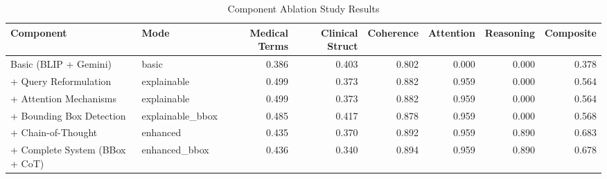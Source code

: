 \begin{table}
\caption{Component Ablation Study Results}
\label{tab:ablation}
\begin{tabular}{llrrrrrr}
\toprule
Component & Mode & Medical Terms & Clinical Struct & Coherence & Attention & Reasoning & Composite \\
\midrule
Basic (BLIP + Gemini) & basic & 0.386 & 0.403 & 0.802 & 0.000 & 0.000 & 0.378 \\
+ Query Reformulation & explainable & 0.499 & 0.373 & 0.882 & 0.959 & 0.000 & 0.564 \\
+ Attention Mechanisms & explainable & 0.499 & 0.373 & 0.882 & 0.959 & 0.000 & 0.564 \\
+ Bounding Box Detection & explainable_bbox & 0.485 & 0.417 & 0.878 & 0.959 & 0.000 & 0.568 \\
+ Chain-of-Thought & enhanced & 0.435 & 0.370 & 0.892 & 0.959 & 0.890 & 0.683 \\
+ Complete System (BBox + CoT) & enhanced_bbox & 0.436 & 0.340 & 0.894 & 0.959 & 0.890 & 0.678 \\
\bottomrule
\end{tabular}
\end{table}
